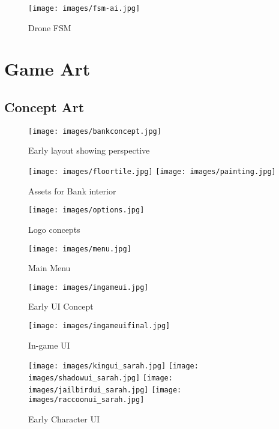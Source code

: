 \documentclass[10pt]{report}
\begin{document}
\begin{figure}[h!]
	\texttt{[image: images/fsm-ai.jpg]}
	\caption{Drone FSM}
\end{figure}

\chapter{Game Art}

\section{Concept Art}

\begin{figure}[H]
	\texttt{[image: images/bankconcept.jpg]}
    \caption{Early layout showing perspective}
\end{figure}

\begin{figure}[H]
    \centering
    \texttt{[image: images/floortile.jpg]}
    \texttt{[image: images/painting.jpg]}
    \caption{Assets for Bank interior}
\end{figure}

\begin{figure}[H]
	\texttt{[image: images/options.jpg]}
    \caption{Logo concepts}
\end{figure}

\begin{figure}[H]
	\texttt{[image: images/menu.jpg]}
    \caption{Main Menu}
\end{figure}

\begin{figure}[H]
	\texttt{[image: images/ingameui.jpg]}
    \caption{Early UI Concept}
\end{figure}

\begin{figure}[H]
	\texttt{[image: images/ingameuifinal.jpg]}
    \caption{In-game UI}
\end{figure}

\begin{figure}[H]
    \centering
	\texttt{[image: images/kingui\_sarah.jpg]}
	\texttt{[image: images/shadowui\_sarah.jpg]}
	\texttt{[image: images/jailbirdui\_sarah.jpg]}
	\texttt{[image: images/raccoonui\_sarah.jpg]}
    \caption{Early Character UI}
\end{figure}
\end{document}
